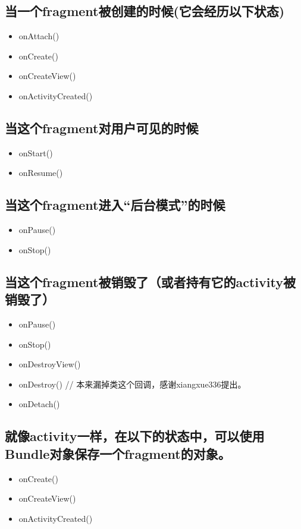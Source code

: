 \documentclass[9pt, b5paaper]{book}
\begin{document}
\subsection{当一个fragment被创建的时候(它会经历以下状态)}
\label{sec-3-1-1}
\begin{itemize}
\item onAttach()
\item onCreate()
\item onCreateView()
\item onActivityCreated()
\end{itemize}
\subsection{当这个fragment对用户可见的时候}
\label{sec-3-1-2}
\begin{itemize}
\item onStart()
\item onResume()
\end{itemize}
\subsection{当这个fragment进入“后台模式”的时候}
\label{sec-3-1-3}
\begin{itemize}
\item onPause()
\item onStop()
\end{itemize}
\subsection{当这个fragment被销毁了（或者持有它的activity被销毁了）}
\label{sec-3-1-4}
\begin{itemize}
\item onPause()
\item onStop()
\item onDestroyView()
\item onDestroy() // 本来漏掉类这个回调，感谢xiangxue336提出。
\item onDetach()
\end{itemize}
\subsection{就像activity一样，在以下的状态中，可以使用Bundle对象保存一个fragment的对象。}
\label{sec-3-1-5}
\begin{itemize}
\item onCreate()
\item onCreateView()
\item onActivityCreated()
\end{itemize}
\end{document}
